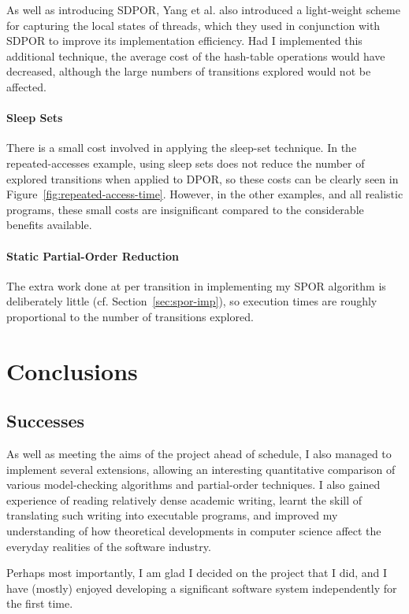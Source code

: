 \documentclass[12pt,a4paper,twoside,openright]{report}
\begin{document}
As well as introducing SDPOR, Yang et al.\@
also introduced a light-weight
scheme for capturing the local states of
threads, which they used in conjunction with
SDPOR to improve its implementation efficiency.
Had I implemented this additional
technique, the average cost of the hash-table
operations would have decreased, although
the large numbers of transitions explored
would not be affected.

\subsubsection{Sleep Sets}
There is a small cost involved in
applying the sleep-set technique.
In the repeated-accesses example,
using sleep sets does not reduce the number
of explored transitions when applied
to DPOR, so these costs can be clearly
seen in Figure~\ref{fig:repeated-access-time}.
However, in the other examples, and all
realistic programs, these
small costs are insignificant compared
to the considerable benefits available.

\subsubsection{Static Partial-Order Reduction}
The extra work done at per transition
in implementing my SPOR
algorithm is deliberately little
(cf. Section~\ref{sec:spor-imp}), so
execution times are roughly proportional
to the number of transitions explored.

\chapter{Conclusions}

\section{Successes}

As well as meeting the aims of the
project ahead of schedule, I also
managed to implement several
extensions, allowing an
interesting quantitative
comparison of various
model-checking algorithms
and partial-order techniques.
I also gained experience of
reading relatively dense academic
writing, learnt the skill of
translating such writing into
executable programs, and
improved my understanding
of how theoretical developments
in computer science affect the
everyday realities of the
software industry.

Perhaps most importantly,
I am glad I decided on the
project that I did, and
I have (mostly) enjoyed
developing a significant
software system independently
for the first time.
\end{document}
